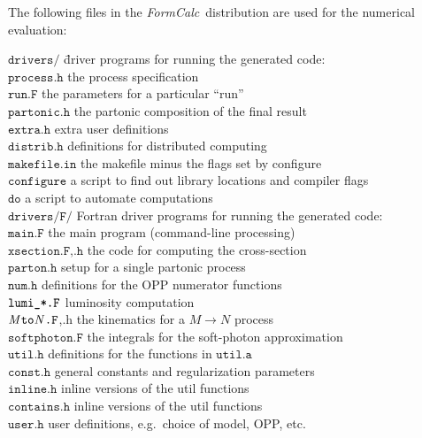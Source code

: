 \documentclass[twoside,11pt]{article}
\def\FC{\textit{FormCalc}}
\def\Var#1{\ensuremath{\mathit{#1}}}
\def\MtoN.#1{\Code{\Var{M}to\Var{N}.#1}}
\def\Code#1{\ensuremath{\texttt{#1}}}
\def\eg{e.g.\ }
\def\uscore{\symbol{95}}
\begin{document}
The following files in the \FC\ distribution are used for the numerical 
evaluation:
\begin{tabbing}
\Code{drivers/}\hspace{.18\linewidth} \=
	driver programs for running the generated code: \\
\quad\Code{process.h} \>
	the process specification \\
\quad\Code{run.F} \>
	the parameters for a particular ``run'' \\
\quad\Code{partonic.h} \>
	the partonic composition of the final result \\
\quad\Code{extra.h} \>
	extra user definitions \\
\quad\Code{distrib.h} \>
	definitions for distributed computing \\
\quad\Code{makefile.in} \>
	the makefile minus the flags set by configure \\
\quad\Code{configure} \>
	a script to find out library locations and compiler flags \\
\quad\Code{do} \>
	a script to automate computations
\\[1ex]
\Code{drivers/F/} \>
	Fortran driver programs for running the generated code: \\
\quad\Code{main.F} \>
	the main program (command-line processing) \\
\quad\Code{xsection.F,.h} \>
	the code for computing the cross-section \\
\quad\Code{parton.h} \>
	setup for a single partonic process \\
\quad\Code{num.h} \>
	definitions for the OPP numerator functions \\
\quad\Code{lumi\uscore *.F} \>
	luminosity computation \\
\quad\MtoN.F,.h \>
	the kinematics for a $\Var{M}\to\Var{N}$ process \\
\quad\Code{softphoton.F} \>
	the integrals for the soft-photon approximation \\
\quad\Code{util.h} \>
	definitions for the functions in \Code{util.a} \\
\quad\Code{const.h} \>
	general constants and regularization parameters \\
\quad\Code{inline.h} \>
	inline versions of the util functions \\
\quad\Code{contains.h} \>
	inline versions of the util functions \\
\quad\Code{user.h} \>
	user definitions, \eg choice of model, OPP, etc. \\

\end{tabbing}
\end{document}
